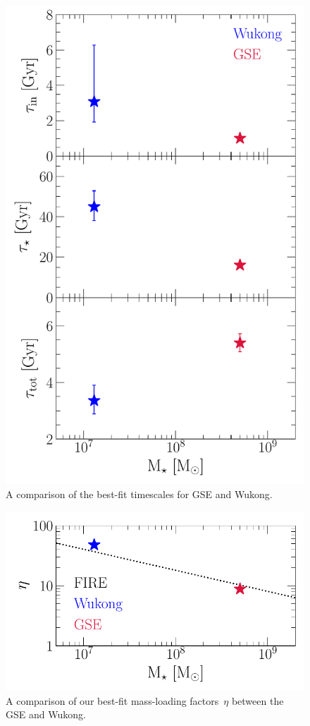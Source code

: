 \documentclass[ms.tex]{subfiles}
\begin{document}
\begin{figure}
\centering
\includegraphics[scale = 0.6]{gse_wukong_timescales.pdf}
\caption{
A comparison of the best-fit timescales for GSE and Wukong.
}
\label{fig:gse_wukong_timescales}
\end{figure}

\begin{figure}
\centering
\includegraphics[scale = 0.6]{gse_wukong_eta.pdf}
\caption{
A comparison of our best-fit mass-loading factors~$\eta$ between the GSE and
Wukong.
}
\label{fig:gse_wukong_eta}
\end{figure}
\end{document}
